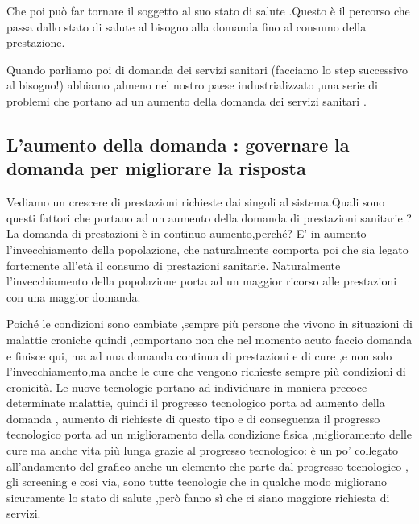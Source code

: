 Che poi può far tornare il soggetto al suo stato di salute .Questo è il
percorso che passa dallo stato di salute al bisogno alla domanda fino al
consumo della prestazione.

Quando parliamo poi di domanda dei servizi sanitari (facciamo lo step
successivo al bisogno!) abbiamo ,almeno nel nostro paese
industrializzato ,una serie di problemi che portano ad un aumento della
domanda dei servizi sanitari .

\subsection{L'aumento della domanda : governare la domanda per migliorare la
risposta}

Vediamo un crescere di prestazioni richieste dai singoli al
sistema.Quali sono questi fattori che portano ad un aumento della
domanda di prestazioni sanitarie ? La domanda di prestazioni è in
continuo aumento,perché? E' in aumento l'invecchiamento della
popolazione, che naturalmente comporta poi che sia legato fortemente
all'età il consumo di prestazioni sanitarie. Naturalmente
l'invecchiamento della popolazione porta ad un maggior ricorso alle
prestazioni con una maggior domanda.

Poiché le condizioni sono cambiate ,sempre più persone che vivono in
situazioni di malattie croniche quindi ,comportano non che nel momento
acuto faccio domanda e finisce qui, ma ad una domanda continua di
prestazioni e di cure ,e non solo l'invecchiamento,ma anche le cure che
vengono richieste sempre più condizioni di cronicità. Le nuove
tecnologie portano ad individuare in maniera precoce determinate
malattie, quindi il progresso tecnologico porta ad aumento della domanda
, aumento di richieste di questo tipo e di conseguenza il progresso
tecnologico porta ad un miglioramento della condizione fisica
,miglioramento delle cure ma anche vita più lunga grazie al progresso
tecnologico: è un po' collegato all'andamento del grafico anche un
elemento che parte dal progresso tecnologico , gli screening e cosi via,
sono tutte tecnologie che in qualche modo migliorano sicuramente lo
stato di salute ,però fanno sì che ci siano maggiore richiesta di
servizi.

